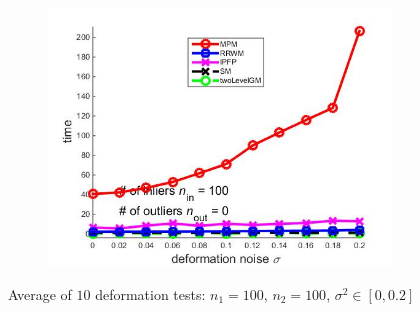 \documentclass[
	fontsize=12pt,
	paper=a4,
	twoside=false,
	numbers=noenddot,
	plainheadsepline,
	toc=listof,
	toc=bibliography
]{scrartcl}
\begin{document}
\begin{figure}[h]
\begin{subfigure}[b]{0.3\textwidth}
		\includegraphics[scale=0.25]{"fig_ver2108/syntheticPointSets/deformation_test/time_avg10tests"} 
	\end{subfigure} 	
	\caption{ Average of $10$ deformation tests: $n_1=100$, $n_2=100$, $\sigma^2\in[0, 0.2]$}
	\label{fig:def_test2}	
\end{figure}

\FloatBarrier	
\end{document}
